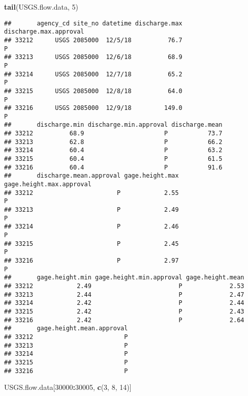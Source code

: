 \documentclass[]{article}
\newenvironment{Shaded}{\begin{snugshade}}{\end{snugshade}}
\newcommand{\KeywordTok}[1]{\textcolor[rgb]{0.13,0.29,0.53}{\textbf{#1}}}
\newcommand{\DecValTok}[1]{\textcolor[rgb]{0.00,0.00,0.81}{#1}}
\newcommand{\OperatorTok}[1]{\textcolor[rgb]{0.81,0.36,0.00}{\textbf{#1}}}
\newcommand{\NormalTok}[1]{#1}
\begin{document}
\begin{Shaded}
\begin{Highlighting}[]
\KeywordTok{tail}\NormalTok{(USGS.flow.data, }\DecValTok{5}\NormalTok{)}
\end{Highlighting}
\end{Shaded}

\begin{verbatim}
##       agency_cd site_no datetime discharge.max discharge.max.approval
## 33212      USGS 2085000  12/5/18          76.7                      P
## 33213      USGS 2085000  12/6/18          68.9                      P
## 33214      USGS 2085000  12/7/18          65.2                      P
## 33215      USGS 2085000  12/8/18          64.0                      P
## 33216      USGS 2085000  12/9/18         149.0                      P
##       discharge.min discharge.min.approval discharge.mean
## 33212          68.9                      P           73.7
## 33213          62.8                      P           66.2
## 33214          60.4                      P           63.2
## 33215          60.4                      P           61.5
## 33216          60.4                      P           91.6
##       discharge.mean.approval gage.height.max gage.height.max.approval
## 33212                       P            2.55                        P
## 33213                       P            2.49                        P
## 33214                       P            2.46                        P
## 33215                       P            2.45                        P
## 33216                       P            2.97                        P
##       gage.height.min gage.height.min.approval gage.height.mean
## 33212            2.49                        P             2.53
## 33213            2.44                        P             2.47
## 33214            2.42                        P             2.44
## 33215            2.42                        P             2.43
## 33216            2.42                        P             2.64
##       gage.height.mean.approval
## 33212                         P
## 33213                         P
## 33214                         P
## 33215                         P
## 33216                         P
\end{verbatim}

\begin{Shaded}
\begin{Highlighting}[]
\NormalTok{USGS.flow.data[}\DecValTok{30000}\OperatorTok{:}\DecValTok{30005}\NormalTok{, }\KeywordTok{c}\NormalTok{(}\DecValTok{3}\NormalTok{, }\DecValTok{8}\NormalTok{, }\DecValTok{14}\NormalTok{)]}
\end{Highlighting}
\end{Shaded}
\end{document}
